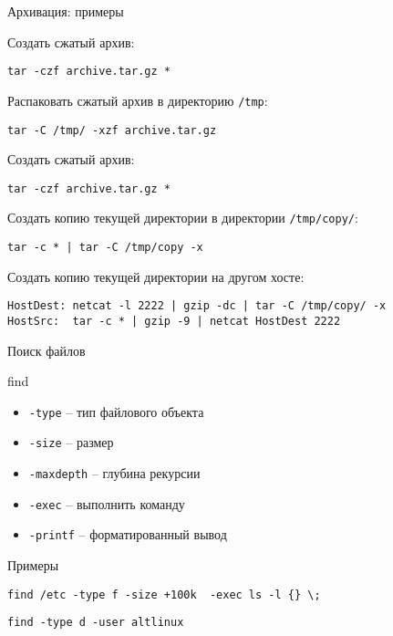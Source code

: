 \begin{frame}[fragile]{Архивация: примеры}

	Создать сжатый архив:
	\begin{verbatim}
tar -czf archive.tar.gz *
	\end{verbatim}
	\pause
	Распаковать сжатый архив в директорию {\tt /tmp}:
	\begin{verbatim}
tar -C /tmp/ -xzf archive.tar.gz 
	\end{verbatim}
	\pause
	Создать сжатый архив:
	\begin{verbatim}
tar -czf archive.tar.gz *
	\end{verbatim}
	\pause
	Создать копию текущей директории в директории {\tt /tmp/copy/}:
	\begin{verbatim}
tar -c * | tar -C /tmp/copy -x
	\end{verbatim}
	\pause
	Создать копию текущей директории на другом хосте:
	\begin{verbatim}
HostDest: netcat -l 2222 | gzip -dc | tar -C /tmp/copy/ -x
HostSrc:  tar -c * | gzip -9 | netcat HostDest 2222
	\end{verbatim}
\end{frame}

\begin{frame}[fragile]{Поиск файлов}
	\begin{block}{find}
		\begin{itemize}
			\item {\tt -type} -- тип файлового объекта
			\item {\tt -size} -- размер
			\item {\tt -maxdepth} -- глубина рекурсии
			\item {\tt -exec} -- выполнить команду
			\item {\tt -printf} -- форматированный вывод
		\end{itemize}
	\end{block}

	\begin{block}{Примеры}
		\begin{verbatim}
find /etc -type f -size +100k  -exec ls -l {} \;
		\end{verbatim}

		\begin{verbatim}
find -type d -user altlinux
		\end{verbatim}
	
	\end{block}
\end{frame}

